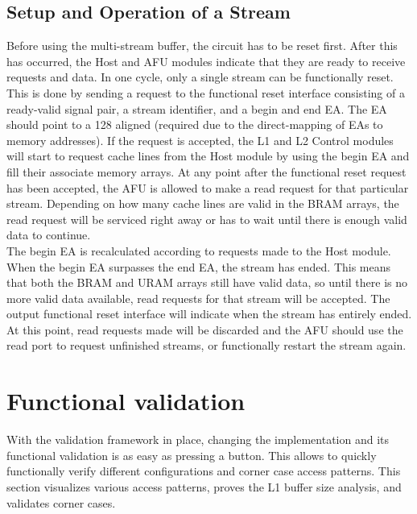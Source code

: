 \subsection{Setup and Operation of a Stream}
Before using the multi-stream buffer, the circuit has to be reset first. After this has occurred, the Host and AFU modules indicate that they are ready to receive requests and data. In one cycle, only a single stream can be functionally reset. This is done by sending a request to the functional reset interface consisting of a ready-valid signal pair, a stream identifier, and a begin and end EA. The EA should point to a \SI{128}{\byte} aligned (required due to the direct-mapping of EAs to memory addresses). If the request is accepted, the L1 and L2 Control modules will start to request cache lines from the Host module by using the begin EA and fill their associate memory arrays. At any point after the functional reset request has been accepted, the AFU is allowed to make a read request for that particular stream. Depending on how many cache lines are valid in the BRAM arrays, the read request will be serviced right away or has to wait until there is enough valid data to continue.\\
The begin EA is recalculated according to requests made to the Host module. When the begin EA surpasses the end EA, the stream has ended. This means that both the BRAM and URAM arrays still have valid data, so until there is no more valid data available, read requests for that stream will be accepted. The output functional reset interface will indicate when the stream has entirely ended. At this point, read requests made will be discarded and the AFU should use the read port to request unfinished streams, or functionally restart the stream again.





\section{Functional validation}
With the validation framework in place, changing the implementation and its functional validation is as easy as pressing a button. This allows to quickly functionally verify different configurations and corner case access patterns. This section visualizes various access patterns, proves the L1 buffer size analysis, and validates corner cases.

